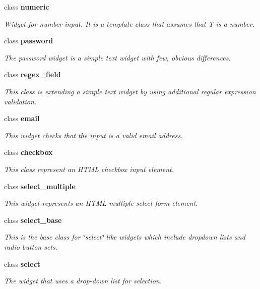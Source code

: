 \begin{DoxyCompactItemize}
class {\bf numeric}
\begin{DoxyCompactList}\small\item\em \-Widget for number input. \-It is a template class that assumes that \-T is a number. \end{DoxyCompactList}\item 
class {\bf password}
\begin{DoxyCompactList}\small\item\em \-The password widget is a simple text widget with few, obvious differences. \end{DoxyCompactList}\item 
class {\bf regex\-\_\-field}
\begin{DoxyCompactList}\small\item\em \-This class is extending a simple text widget by using additional regular expression validation. \end{DoxyCompactList}\item 
class {\bf email}
\begin{DoxyCompactList}\small\item\em \-This widget checks that the input is a valid email address. \end{DoxyCompactList}\item 
class {\bf checkbox}
\begin{DoxyCompactList}\small\item\em \-This class represent an \-H\-T\-M\-L checkbox input element. \end{DoxyCompactList}\item 
class {\bf select\-\_\-multiple}
\begin{DoxyCompactList}\small\item\em \-This widget represents an \-H\-T\-M\-L multiple select form element. \end{DoxyCompactList}\item 
class {\bf select\-\_\-base}
\begin{DoxyCompactList}\small\item\em \-This is the base class for \char`\"{}select\char`\"{} like widgets which include dropdown lists and radio button sets. \end{DoxyCompactList}\item 
class {\bf select}
\begin{DoxyCompactList}\small\item\em \-The widget that uses a drop-\/down list for selection. \end{DoxyCompactList}\item 

\end{DoxyCompactItemize}
